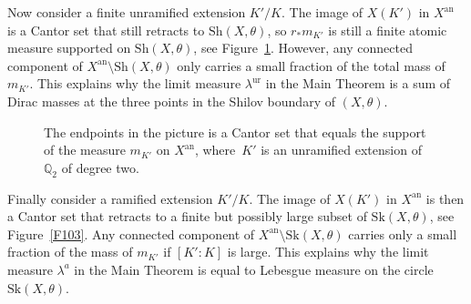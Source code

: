 \documentclass[11pt]{article}
\newcommand{\smaller}{\small}
\theoremstyle{definition}
\numberwithin{equation}{subsection}
\newcommand{\Q}{\ensuremath{\mathbb{Q}}}
\newcommand{\an}{\mathrm{an}}
\newcommand{\Sh}{\mathrm{Sh}}
\newcommand{\Sk}{\mathrm{Sk}}
\newcommand{\ur}{\mathrm{ur}}
\let\form\theta
\let\Leb\lambda
\begin{document}
Now consider a finite unramified extension $K'/K$. The image of $X(K')$ in $X^{\an}$ is a Cantor set that still retracts to $\Sh(X,\form)$, so $r_*m_{K'}$ is still a finite atomic measure supported on $\Sh(X,\form)$, see Figure~\ref{F102}.
However, any connected component of $X^{\an}\setminus\Sh(X,\form)$ only carries a small fraction of the total mass of $m_{K'}$.
This explains why the limit measure $\Leb^{\ur}$ in the Main Theorem is a sum of Dirac masses at the three points in the Shilov boundary of $(X,\form)$.
\begin{figure}[ht]
\centering
{}
\caption{\smaller The endpoints in the picture is a Cantor set that equals the support of the measure $m_{K'}$ on $X^{\an}$, where~$K'$ is an unramified extension of $\Q_2$ of degree two.}\label{F102}
\end{figure}

Finally consider a ramified extension $K'/K$.
The image of $X(K')$ in $X^{\an}$ is then a Cantor set that retracts to a finite but possibly large subset of $\Sk(X,\form)$, see Figure~\ref{F103}. Any connected component of $X^{\an}\setminus\Sk(X,\form)$ carries only a small fraction of the mass of $m_{K'}$ if $[K':K]$ is large.
This explains why the limit measure $\Leb^a$ in the Main Theorem is equal to Lebesgue measure on the circle $\Sk(X,\form)$.
\end{document}
